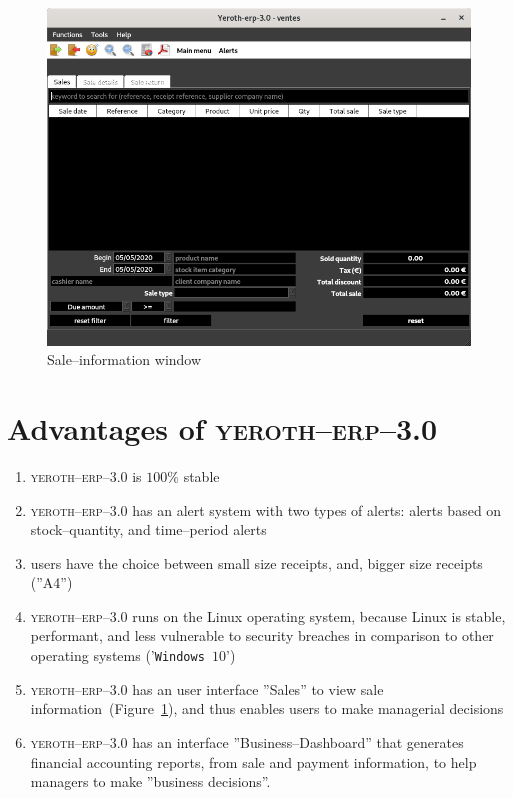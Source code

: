 \documentclass[a4paper, 10pt, twocolumn]{article}
\newcommand{\yeren}{\textsc{yeroth--erp--3.0}\xspace}
\begin{document}
\begin{figure}[!htbp]
\centering
\includegraphics[scale=0.32]{../../francais/images/yeren-window-sale-information.png}
\caption{Sale--information window}
\label{fig:fenetre-de-la-vente}
\end{figure}

\vspace{-1.9em}
\section{Advantages of \yeren}
\vspace{-0.3em}
\begin{enumerate}[1)]
	\itemsep -0.3em
	\item \yeren is $100\%$ stable
	\item \yeren has an alert system with two types of alerts:
	      alerts based on stock--quantity, and time--period alerts
	\item users have the choice between small size receipts,
	      and, bigger size receipts (''A4'')
	\item \yeren runs on the Linux operating system,
	      because Linux is stable, performant, and less
	      vulnerable to security breaches in comparison
	      to other operating systems ('\texttt{Windows~$10$}')
	\item \yeren has an user interface ''Sales'' to view
		  sale information~(Figure~\ref{fig:fenetre-de-la-vente}),
		  and thus enables users to make managerial decisions
	\item \yeren has an interface ''Business--Dashboard'' that
		  generates financial accounting reports,
		  from sale and payment information, to help
		  managers to make ''business decisions''.
\end{enumerate}
\end{document}
